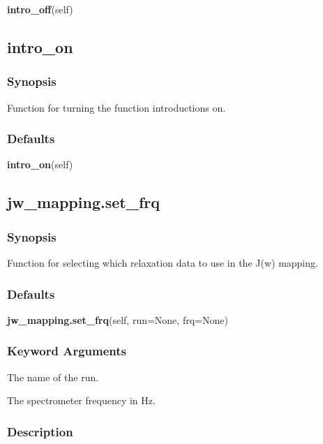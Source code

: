 \textsf{\textbf{intro\_off}(self)}



\newpage

\subsection{intro\_on}


\subsubsection{Synopsis}

Function for turning the function introductions on.

\subsubsection{Defaults}

\textsf{\textbf{intro\_on}(self)}



\newpage

\subsection{jw\_mapping.set\_frq}


\subsubsection{Synopsis}

Function for selecting which relaxation data to use in the J(w) mapping.

\subsubsection{Defaults}

\textsf{\textbf{jw\_mapping.set\_frq}(self, run=None, frq=None)}


\subsubsection{Keyword Arguments}


  The name of the run.

  The spectrometer frequency in Hz.

\subsubsection{Description}

